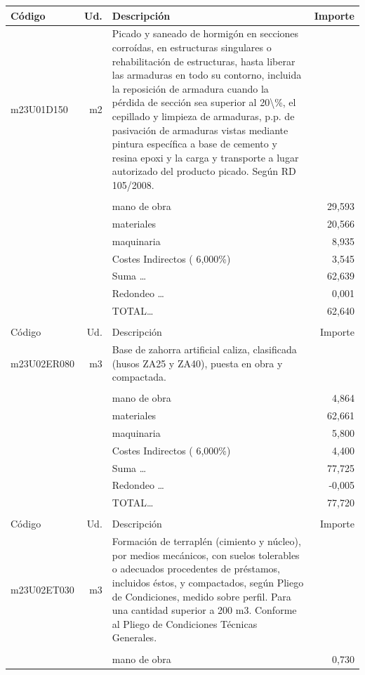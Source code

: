 \documentclass{book}%
\begin{document}
\begin{supertabular}{l r p{60mm} r}
Código&Ud.&Descripción&Importe\\%
\hline%
m23U01D150&m2&Picado y saneado de hormigón en secciones corroídas, en estructuras singulares o rehabilitación de estructuras, hasta liberar las armaduras en todo su contorno, incluida la reposición de armadura cuando la pérdida de sección sea superior al 20\textbackslash{}\%, el cepillado y limpieza de armaduras, p.p. de pasivación de armaduras vistas mediante pintura específica a base de cemento y resina epoxi y la carga y transporte a lugar autorizado del producto picado. Según RD 105/2008.&\\%
&&&\\%
&&mano de obra&    29,593\\%
&&materiales&    20,566\\%
&&maquinaria&     8,935\\%
&&Costes Indirectos (     6,000\%)&     3,545\\%
&&Suma \ldots&    62,639\\%
&&Redondeo \ldots&     0,001\\%
%
&&TOTAL\ldots&    62,640\\%
&&&\\%
Código&Ud.&Descripción&Importe\\%
\hline%
m23U02ER080&m3&Base de zahorra artificial caliza, clasificada (husos ZA25 y ZA40), puesta en obra y compactada.&\\%
&&&\\%
&&mano de obra&     4,864\\%
&&materiales&    62,661\\%
&&maquinaria&     5,800\\%
&&Costes Indirectos (     6,000\%)&     4,400\\%
&&Suma \ldots&    77,725\\%
&&Redondeo \ldots&    {-}0,005\\%
%
&&TOTAL\ldots&    77,720\\%
&&&\\%
Código&Ud.&Descripción&Importe\\%
\hline%
m23U02ET030&m3&Formación de terraplén (cimiento y núcleo), por medios mecánicos, con suelos tolerables o adecuados procedentes de préstamos, incluidos éstos, y compactados, según Pliego de Condiciones, medido sobre perfil. Para una cantidad superior a 200 m3. Conforme al Pliego de Condiciones Técnicas Generales.&\\%
&&&\\%
&&mano de obra&     0,730\\%

\end{supertabular}
\end{document}
